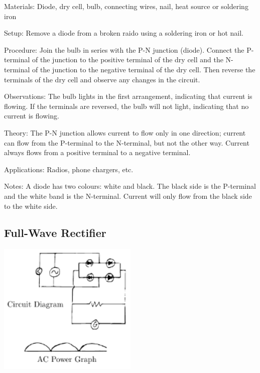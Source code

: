 \begin{multicols}{2}
\begin{description*}
\item[Materials:]{Diode, dry cell, bulb, connecting wires, nail, heat source or soldering iron}
\item[Setup:]{Remove a diode from a broken raido using a soldering iron or hot nail.}
\item[Procedure:]{Join the bulb in series with the P-N junction (diode). Connect the P-terminal of the junction to the positive terminal of the dry cell and the N-terminal of the junction to the negative terminal of the dry cell. Then reverse the terminals of the dry cell and observe any changes in the circuit.}
\item[Observations:]{The bulb lights in the first arrangement, indicating that current is flowing. If the terminals are reversed, the bulb will not light, indicating that no current is flowing.}
\item[Theory:]{The P-N junction allows current to flow only in one direction; current can flow from the P-terminal to the N-terminal, but not the other way. Current always flows from a positive terminal to a negative terminal.}
\item[Applications:]{Radios, phone chargers, etc.}
\item[Notes:]{A diode has two colours: white and black. The black side is the P-terminal and the white band is the N-terminal. Current will only flow from the black side to the white side.}
\end{description*}

\vfill
\columnbreak

\subsection{Full-Wave Rectifier}

\begin{center}
\includegraphics[width=0.5\textwidth]{./img/full-wave-rectifier-2.png}
\end{center}


\end{multicols}

